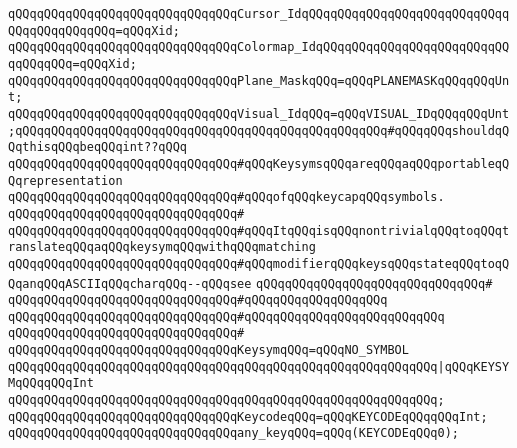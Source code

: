 \verb|qQQqqQQqqQQqqQQqqQQqqQQqqQQqqQQqCursor_IdqQQqqQQqqQQqqQQqqQQqqQQqqQQqqQQqqQQqqQQqqQQq=qQQqXid;|\newline
\verb|qQQqqQQqqQQqqQQqqQQqqQQqqQQqqQQqColormap_IdqQQqqQQqqQQqqQQqqQQqqQQqqQQqqQQqqQQq=qQQqXid;|\newline
\newline
\verb|qQQqqQQqqQQqqQQqqQQqqQQqqQQqqQQqPlane_MaskqQQq=qQQqPLANEMASKqQQqqQQqUnt;|\newline
\newline
\verb|qQQqqQQqqQQqqQQqqQQqqQQqqQQqqQQqVisual_IdqQQq=qQQqVISUAL_IDqQQqqQQqUnt;qQQqqQQqqQQqqQQqqQQqqQQqqQQqqQQqqQQqqQQqqQQqqQQqqQQq#qQQqqQQqshouldqQQqthisqQQqbeqQQqint??qQQq|\newline
\newline
\verb|qQQqqQQqqQQqqQQqqQQqqQQqqQQqqQQq#qQQqKeysymsqQQqareqQQqaqQQqportableqQQqrepresentation|\newline
\verb|qQQqqQQqqQQqqQQqqQQqqQQqqQQqqQQq#qQQqofqQQqkeycapqQQqsymbols.|\newline
\verb|qQQqqQQqqQQqqQQqqQQqqQQqqQQqqQQq#|\newline
\verb|qQQqqQQqqQQqqQQqqQQqqQQqqQQqqQQq#qQQqItqQQqisqQQqnontrivialqQQqtoqQQqtranslateqQQqaqQQqkeysymqQQqwithqQQqmatching|\newline
\verb|qQQqqQQqqQQqqQQqqQQqqQQqqQQqqQQq#qQQqmodifierqQQqkeysqQQqstateqQQqtoqQQqanqQQqASCIIqQQqcharqQQq--qQQqsee|\newline
\verb|qQQqqQQqqQQqqQQqqQQqqQQqqQQqqQQq#|\newline
\verb|qQQqqQQqqQQqqQQqqQQqqQQqqQQqqQQq#qQQqqQQqqQQqqQQqqQQq|\newline
\verb|qQQqqQQqqQQqqQQqqQQqqQQqqQQqqQQq#qQQqqQQqqQQqqQQqqQQqqQQqqQQq|\newline
\verb|qQQqqQQqqQQqqQQqqQQqqQQqqQQqqQQq#|\newline
\verb|qQQqqQQqqQQqqQQqqQQqqQQqqQQqqQQqKeysymqQQq=qQQqNO_SYMBOL|\newline
\verb|qQQqqQQqqQQqqQQqqQQqqQQqqQQqqQQqqQQqqQQqqQQqqQQqqQQqqQQqqQQq|\verb#|qQQqKEYSYMqQQqqQQqInt#\newline
\verb|qQQqqQQqqQQqqQQqqQQqqQQqqQQqqQQqqQQqqQQqqQQqqQQqqQQqqQQqqQQq;|\newline
\newline
\verb|qQQqqQQqqQQqqQQqqQQqqQQqqQQqqQQqKeycodeqQQq=qQQqKEYCODEqQQqqQQqInt;|\newline
\newline
\verb|qQQqqQQqqQQqqQQqqQQqqQQqqQQqqQQqany_keyqQQq=qQQq(KEYCODEqQQq0);|\newline

